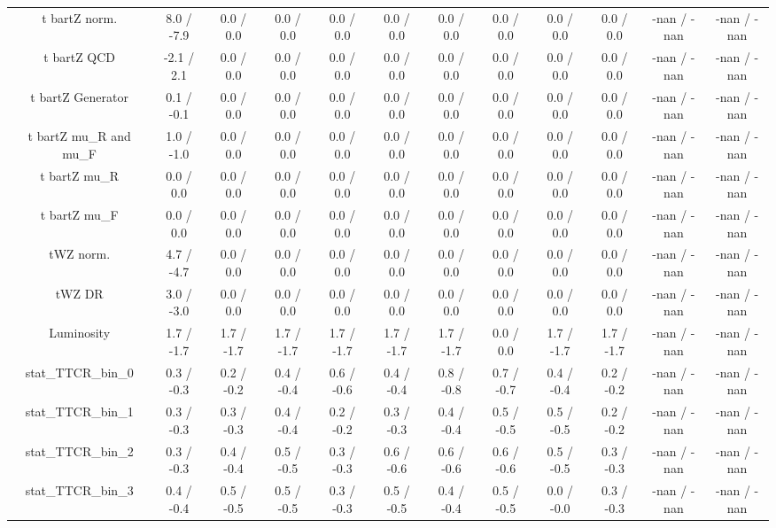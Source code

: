 \begin{table}[htbp]
\begin{center}
\begin{tabular}{|c|c|c|c|c|c|c|c|c|c|c|c|}
  t bar{t}Z norm. & 8.0 / -7.9 & 0.0 / 0.0 & 0.0 / 0.0 & 0.0 / 0.0 & 0.0 / 0.0 & 0.0 / 0.0 & 0.0 / 0.0 & 0.0 / 0.0 & 0.0 / 0.0 & -nan / -nan & -nan / -nan \\ 
  t bar{t}Z QCD & -2.1 / 2.1 & 0.0 / 0.0 & 0.0 / 0.0 & 0.0 / 0.0 & 0.0 / 0.0 & 0.0 / 0.0 & 0.0 / 0.0 & 0.0 / 0.0 & 0.0 / 0.0 & -nan / -nan & -nan / -nan \\ 
  t bar{t}Z Generator & 0.1 / -0.1 & 0.0 / 0.0 & 0.0 / 0.0 & 0.0 / 0.0 & 0.0 / 0.0 & 0.0 / 0.0 & 0.0 / 0.0 & 0.0 / 0.0 & 0.0 / 0.0 & -nan / -nan & -nan / -nan \\ 
  t bar{t}Z  mu_{R} and  mu_{F} & 1.0 / -1.0 & 0.0 / 0.0 & 0.0 / 0.0 & 0.0 / 0.0 & 0.0 / 0.0 & 0.0 / 0.0 & 0.0 / 0.0 & 0.0 / 0.0 & 0.0 / 0.0 & -nan / -nan & -nan / -nan \\ 
  t bar{t}Z  mu_{R} & 0.0 / 0.0 & 0.0 / 0.0 & 0.0 / 0.0 & 0.0 / 0.0 & 0.0 / 0.0 & 0.0 / 0.0 & 0.0 / 0.0 & 0.0 / 0.0 & 0.0 / 0.0 & -nan / -nan & -nan / -nan \\ 
  t bar{t}Z  mu_{F} & 0.0 / 0.0 & 0.0 / 0.0 & 0.0 / 0.0 & 0.0 / 0.0 & 0.0 / 0.0 & 0.0 / 0.0 & 0.0 / 0.0 & 0.0 / 0.0 & 0.0 / 0.0 & -nan / -nan & -nan / -nan \\ 
  tWZ norm. & 4.7 / -4.7 & 0.0 / 0.0 & 0.0 / 0.0 & 0.0 / 0.0 & 0.0 / 0.0 & 0.0 / 0.0 & 0.0 / 0.0 & 0.0 / 0.0 & 0.0 / 0.0 & -nan / -nan & -nan / -nan \\ 
  tWZ DR & 3.0 / -3.0 & 0.0 / 0.0 & 0.0 / 0.0 & 0.0 / 0.0 & 0.0 / 0.0 & 0.0 / 0.0 & 0.0 / 0.0 & 0.0 / 0.0 & 0.0 / 0.0 & -nan / -nan & -nan / -nan \\ 
  Luminosity & 1.7 / -1.7 & 1.7 / -1.7 & 1.7 / -1.7 & 1.7 / -1.7 & 1.7 / -1.7 & 1.7 / -1.7 & 0.0 / 0.0 & 1.7 / -1.7 & 1.7 / -1.7 & -nan / -nan & -nan / -nan \\ 
 stat_TTCR_bin_0 & 0.3 / -0.3 & 0.2 / -0.2 & 0.4 / -0.4 & 0.6 / -0.6 & 0.4 / -0.4 & 0.8 / -0.8 & 0.7 / -0.7 & 0.4 / -0.4 & 0.2 / -0.2 & -nan / -nan & -nan / -nan \\ 
 stat_TTCR_bin_1 & 0.3 / -0.3 & 0.3 / -0.3 & 0.4 / -0.4 & 0.2 / -0.2 & 0.3 / -0.3 & 0.4 / -0.4 & 0.5 / -0.5 & 0.5 / -0.5 & 0.2 / -0.2 & -nan / -nan & -nan / -nan \\ 
 stat_TTCR_bin_2 & 0.3 / -0.3 & 0.4 / -0.4 & 0.5 / -0.5 & 0.3 / -0.3 & 0.6 / -0.6 & 0.6 / -0.6 & 0.6 / -0.6 & 0.5 / -0.5 & 0.3 / -0.3 & -nan / -nan & -nan / -nan \\ 
 stat_TTCR_bin_3 & 0.4 / -0.4 & 0.5 / -0.5 & 0.5 / -0.5 & 0.3 / -0.3 & 0.5 / -0.5 & 0.4 / -0.4 & 0.5 / -0.5 & 0.0 / -0.0 & 0.3 / -0.3 & -nan / -nan & -nan / -nan \\ 

\end{tabular}
\end{center}
\end{table}
